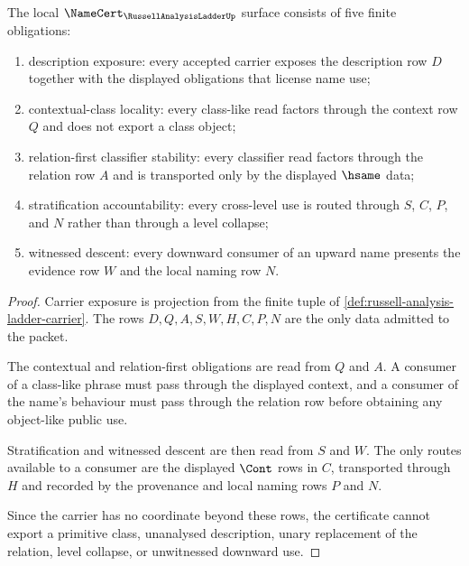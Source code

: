 \begin{theorem}
\label{thm:russell-analysis-ladder-namecert-obligations}
The local $\NameCert_{\RussellAnalysisLadderUp}$ surface consists of five finite obligations:
\begin{enumerate}
\item description exposure: every accepted carrier exposes the description row $D$ together with the displayed obligations that license name use;
\item contextual-class locality: every class-like read factors through the context row $Q$ and does not export a class object;
\item relation-first classifier stability: every classifier read factors through the relation row $A$ and is transported only by the displayed $\hsame$ data;
\item stratification accountability: every cross-level use is routed through $S$, $C$, $P$, and $N$ rather than through a level collapse;
\item witnessed descent: every downward consumer of an upward name presents the evidence row $W$ and the local naming row $N$.
\end{enumerate}
\end{theorem}
\begin{proof}
Carrier exposure is projection from the finite tuple of \autoref{def:russell-analysis-ladder-carrier}. The rows $D,Q,A,S,W,H,C,P,N$ are the only data admitted to the packet.

The contextual and relation-first obligations are read from $Q$ and $A$. A consumer of a class-like phrase must pass through the displayed context, and a consumer of the name's behaviour must pass through the relation row before obtaining any object-like public use.

Stratification and witnessed descent are then read from $S$ and $W$. The only routes available to a consumer are the displayed $\Cont$ rows in $C$, transported through $H$ and recorded by the provenance and local naming rows $P$ and $N$.

Since the carrier has no coordinate beyond these rows, the certificate cannot export a primitive class, unanalysed description, unary replacement of the relation, level collapse, or unwitnessed downward use.
\end{proof}

